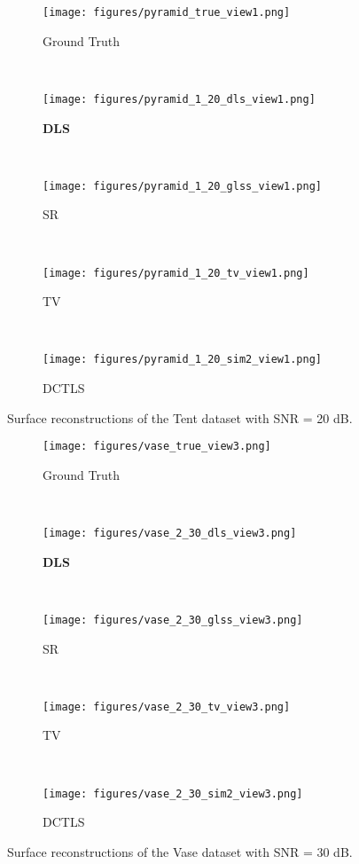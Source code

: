 \begin{figure*}
\centering
\begin{subfigure}[b]{0.18\textwidth}
  \texttt{[image: figures/pyramid\_true\_view1.png]}
  \caption{Ground Truth}
\end{subfigure}
~ %
\begin{subfigure}[b]{0.18\textwidth}
  \texttt{[image: figures/pyramid\_1\_20\_dls\_view1.png]}
  \caption{\textbf{DLS}}
\end{subfigure}
~ 
\begin{subfigure}[b]{0.18\textwidth}
  \texttt{[image: figures/pyramid\_1\_20\_glss\_view1.png]}
  \caption{SR}
\end{subfigure}
~ %
\begin{subfigure}[b]{0.18\textwidth}
  \texttt{[image: figures/pyramid\_1\_20\_tv\_view1.png]}
  \caption{TV}
\end{subfigure}
~
\begin{subfigure}[b]{0.18\textwidth}
  \texttt{[image: figures/pyramid\_1\_20\_sim2\_view1.png]}
  \caption{DCTLS}
\end{subfigure}
\caption{Surface reconstructions of the Tent dataset with SNR = 20 dB.}
\label{fig:tent}
\end{figure*}

\begin{figure*}
\centering
\begin{subfigure}[b]{0.18\textwidth}
  \texttt{[image: figures/vase\_true\_view3.png]}
  \caption{Ground Truth}
\end{subfigure}
~ %
\begin{subfigure}[b]{0.18\textwidth}
  \texttt{[image: figures/vase\_2\_30\_dls\_view3.png]}
  \caption{\textbf{DLS}}
\end{subfigure}
~ 
\begin{subfigure}[b]{0.18\textwidth}
  \texttt{[image: figures/vase\_2\_30\_glss\_view3.png]}
  \caption{SR}
\end{subfigure}
~ %
\begin{subfigure}[b]{0.18\textwidth}
  \texttt{[image: figures/vase\_2\_30\_tv\_view3.png]}
  \caption{TV}
\end{subfigure}
~
\begin{subfigure}[b]{0.18\textwidth}
  \texttt{[image: figures/vase\_2\_30\_sim2\_view3.png]}
  \caption{DCTLS}
\end{subfigure}
\caption{Surface reconstructions of the Vase dataset with SNR = 30 dB.}
\label{fig:vase}
\end{figure*}

